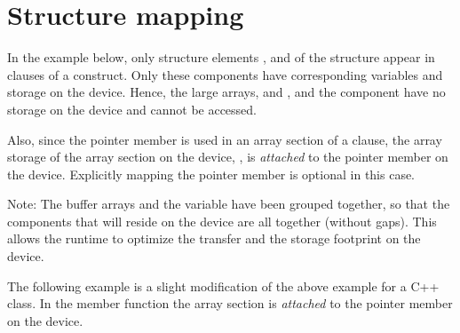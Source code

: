 \pagebreak
\section{Structure mapping}
\label{sec:structure_mapping}


In the example below, only structure elements ,  and  
of the  structure appear in  clauses of a  construct.
Only these components have corresponding variables and storage on the device.  
Hence, the large arrays,  and , and the  component have no storage 
on the device and cannot be accessed.  

Also, since the pointer member  is used in an array section of a 
 clause, the array storage of the array section on the device, 
, is \emph{attached} to the pointer member  on the device.
Explicitly mapping the pointer member  is optional in this case.

Note: The buffer arrays and the  variable have been grouped together, so that
the components that will reside on the device are all together (without gaps).
This allows the runtime to optimize the transfer and the storage footprint on the device.



The following example is a slight modification of the above example for 
a C++ class.  In the member function  
the array section  is \emph{attached} to the pointer member 
on the device.
 


%
%
